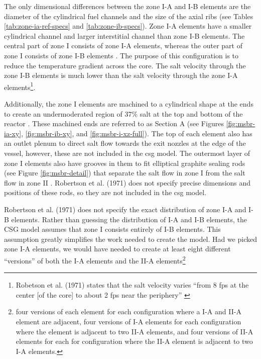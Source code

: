The only dimensional differences between the zone I-A and I-B elements are the
diameter of the cylindrical fuel channels and the size of the axial ribs (see
Tables \ref{tab:zone-ia-ref-specs} and \ref{tab:zone-ib-specs}). Zone I-A
elements have a smaller cylindrical channel and larger interstitial channel
than zone I-B elements. The central part of zone I consists of zone I-A
elements, whereas the outer part of zone I consists of zone I-B
elements \cite{robertson_conceptual_1971}. The purpose of this configuration is to
reduce the temperature gradient across the core. The salt velocity through the
zone I-B elements is much lower than the salt velocity through the zone I-A
elements\footnote{Robetson et al. (1971) states that the salt velocity varies
``from 8 fps at the center [of the core] to about 2 fps near the periphery''
\cite{robertson_conceptual_1971}}.

Additionally, the zone I elements are machined to a cylindrical shape at the ends
to create an undermoderated region of 37\% salt at the top and bottom of the
reactor \cite{robertson_conceptual_1971}. These machined ends are referred to as
Section A (see Figures \ref{fig:msbr-ia-xy}, \ref{fig:msbr-ib-xy}, and
\ref{fig:msbr-i-xz-full}). The top of each element also has an outlet plenum to
direct salt flow towards the exit nozzles at the edge of the vessel, however,
these are not included in the \Gls{csg} model. The outermost layer of zone I
elements also have grooves in them to fit elliptical graphite sealing rods (see
Figure \ref{fig:msbr-detail}) that separate the salt flow in zone I from the
salt flow in zone II \cite{robertson_conceptual_1971}. Robertson et al. (1971)
does not specify precise dimensions and positions of these rods, so they are not
included in the \Gls{csg} model.

Robertson et al. (1971) does not specify the exact distribution of zone I-A and I-B
elements. Rather than guessing the distribution of I-A and I-B elements, the CSG
model assumes that zone I consists entirely of I-B elements. This assumption
greatly simplifies the work needed to create the model. Had we picked zone I-A
elements, we would have needed to create at least eight different ``versions''
of both the I-A elements and the II-A elements\footnote{four versions of each
element for each configuration where a I-A and II-A element are adjacent,
four versions of I-A elements for each configuration where the element is
adjacent to two II-A elements, and four versions of II-A elements for each for
configuration where the II-A element is adjacent to two I-A elements.}

